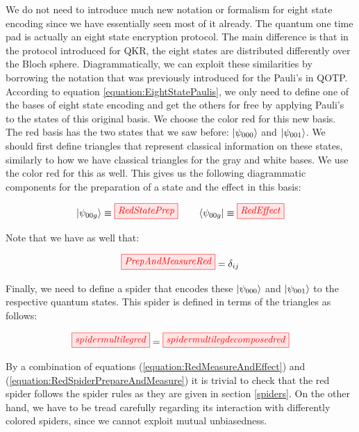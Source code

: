\documentclass[]{article}
\begin{document}
We do not need to introduce much new notation or formalism for eight state encoding since we have essentially seen most of it already. The quantum one time pad is actually an eight state encryption protocol. The main difference is that in the protocol introduced for QKR, the eight states are distributed differently over the Bloch sphere. Diagrammatically, we can exploit these similarities by borrowing the notation that was previously introduced for the Pauli's in QOTP. According to equation \ref{equation:EightStatePaulis}, we only need to define one of the bases of eight state encoding and get the others for free by applying Pauli's to the states of this original basis. We choose the color red for this new basis. The red basis has the two states that we saw before: $\ket{\psi_{000}}$ and $\ket{\psi_{001}}$. We should first define triangles that represent classical information on these states, similarly to how we have classical triangles for the gray and white bases. We use the color red for this as well. This gives us the following diagrammatic components for the preparation of a state and the effect in this basis:

\begin{equation}
	\ket{\psi_{00g}} \equiv \tikzfig{RedStatePrep} ~~~~~~ \bra{\psi_{00g}} \equiv \tikzfig{RedEffect}
\end{equation}

Note that we have as well that:

\begin{equation}
\label{equation:RedMeasureAndEffect}
\tikzfig{PrepAndMeasureRed} = \delta_{ij}
\end{equation}

Finally, we need to define a spider that encodes these $\ket{\psi_{000}}$ and $\ket{\psi_{001}}$ to the respective quantum states. This spider is defined in terms of the triangles as follows:

\begin{equation}
	\label{equation:RedSpiderPrepareAndMeasure}
\tikzfig{spidermultilegred} = \tikzfig{spidermultilegdecomposedred}
\end{equation}

By a combination of equations (\ref{equation:RedMeasureAndEffect}) and (\ref{equation:RedSpiderPrepareAndMeasure}) it is trivial to check that the red spider follows the spider rules as they are given in section \ref{spiders}. On the other hand, we have to be tread carefully regarding its interaction with differently colored spiders, since we cannot exploit mutual unbiasedness.
\end{document}

